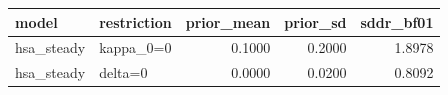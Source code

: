 \begin{tabular}{llrrr}
\toprule
model & restriction & prior\_mean & prior\_sd & sddr\_bf01 \\
\midrule
hsa\_steady & kappa\_0=0 & 0.1000 & 0.2000 & 1.8978 \\
hsa\_steady & delta=0 & 0.0000 & 0.0200 & 0.8092 \\
\bottomrule
\end{tabular}
